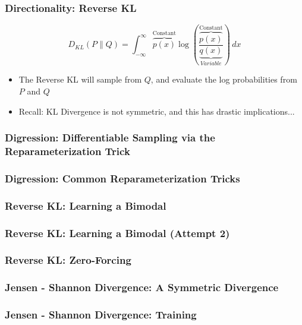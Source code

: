 \documentclass{beamer}
\begin{document}
\begin{frame}
  \frametitle{Directionality: Reverse KL}
  \begin{equation*}
    D_{KL} (P \parallel Q) = \int_{-\infty}^{\infty} \overbrace{p(x)}^{\text{Constant}}\log \left({\frac {\overbrace{p(x)}^{\text{Constant}}}{\underbrace{q(x)}_{Variable}}}\right)\,dx
  \end{equation*}
  \begin{itemize}
    \item The Reverse KL will sample from $Q$, and evaluate the log probabilities from $P$ and $Q$
    \item Recall: KL Divergence is not symmetric, and this has drastic implications...
  \end{itemize}
\end{frame}


\begin{frame}
  \frametitle{Digression: Differentiable Sampling via the Reparameterization Trick}

\end{frame}


\begin{frame}
  \frametitle{Digression: Common Reparameterization Tricks}

\end{frame}


\begin{frame}
  \frametitle{Reverse KL: Learning a Bimodal}

\end{frame}


\begin{frame}
  \frametitle{Reverse KL: Learning a Bimodal (Attempt 2)}

\end{frame}


\begin{frame}
  \frametitle{Reverse KL: Zero-Forcing}

\end{frame}


\begin{frame}
  \frametitle{Jensen - Shannon Divergence: A Symmetric Divergence}

\end{frame}


\begin{frame}
  \frametitle{Jensen - Shannon Divergence: Training}

\end{frame}
\end{document}
